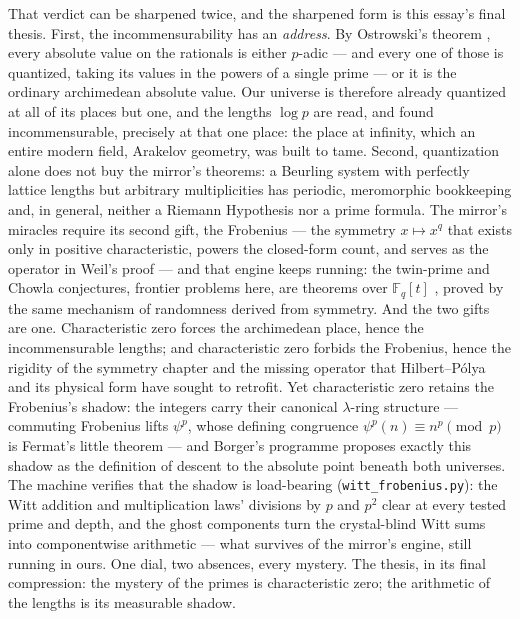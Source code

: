 \documentclass[11pt]{article}
\theoremstyle{remark}
\begin{document}
That verdict can be sharpened twice, and the sharpened form is this essay's final thesis. First, the
incommensurability has an \emph{address}. By Ostrowski's theorem \cite{Ostrowski}, every absolute
value on the rationals is either $p$-adic --- and every one of those is quantized, taking its values
in the powers of a single prime --- or it is the ordinary archimedean absolute value. Our universe is
therefore already quantized at all of its places but one, and the lengths $\log p$ are read, and
found incommensurable, precisely at that one place: the place at infinity, which an entire modern
field, Arakelov geometry, was built to tame. Second, quantization alone does not buy the mirror's
theorems: a Beurling system \cite{Beurling, DiamondZhang} with perfectly lattice lengths but
arbitrary multiplicities has periodic, meromorphic bookkeeping and, in general, neither a Riemann
Hypothesis nor a prime formula. The mirror's miracles require its second gift, the Frobenius --- the
symmetry $x \mapsto x^q$ that exists only in positive characteristic, powers the closed-form count,
and serves as the operator in Weil's proof --- and that engine keeps running: the twin-prime and
Chowla conjectures, frontier problems here, are theorems over $\mathbb{F}_q[t]$
\cite{SawinShusterman}, proved by the same mechanism of randomness derived from symmetry. And the
two gifts are one. Characteristic zero forces the archimedean place, hence the incommensurable
lengths; and characteristic zero forbids the Frobenius, hence the rigidity of the symmetry chapter
and the missing operator that Hilbert--P\'olya and its physical form \cite{BerryKeating} have
sought to retrofit. Yet characteristic zero retains the Frobenius's shadow: the integers carry
their canonical $\lambda$-ring structure --- commuting Frobenius lifts $\psi^p$, whose defining
congruence $\psi^p(n) \equiv n^p \pmod p$ is Fermat's little theorem --- and Borger's programme
\cite{Borger} proposes exactly this shadow as the definition of descent to the absolute point
beneath both universes. The machine verifies that the shadow is load-bearing
(\texttt{witt\_frobenius.py}): the Witt addition and multiplication laws' divisions by $p$ and
$p^2$ clear at every tested prime and depth, and the ghost components turn the crystal-blind Witt
sums into componentwise arithmetic --- what survives of the mirror's engine, still running in
ours. One dial, two absences, every mystery. The thesis, in its final compression: the
mystery of the primes is characteristic zero; the arithmetic of the lengths is its measurable
shadow.
\end{document}
